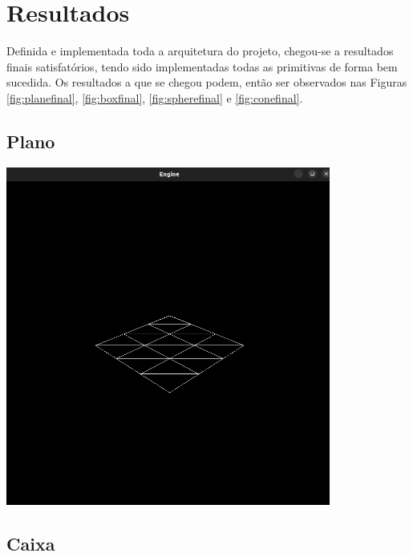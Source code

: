 \section{Resultados}

Definida e implementada toda a arquitetura do projeto, chegou-se a
resultados finais satisfatórios, tendo sido implementadas todas as
primitivas de forma bem sucedida.\newline
\break
\noindent
Os resultados a que se chegou podem, então ser observados nas Figuras
\ref{fig:planefinal}, \ref{fig:boxfinal}, \ref{fig:spherefinal}
e \ref{fig:conefinal}.

\subsection{Plano}

\begin{center}
    \includegraphics[width=0.8\textwidth]{imgs/final/plane.png}
    \label{fig:planefinal}
\end{center}

\subsection{Caixa}

